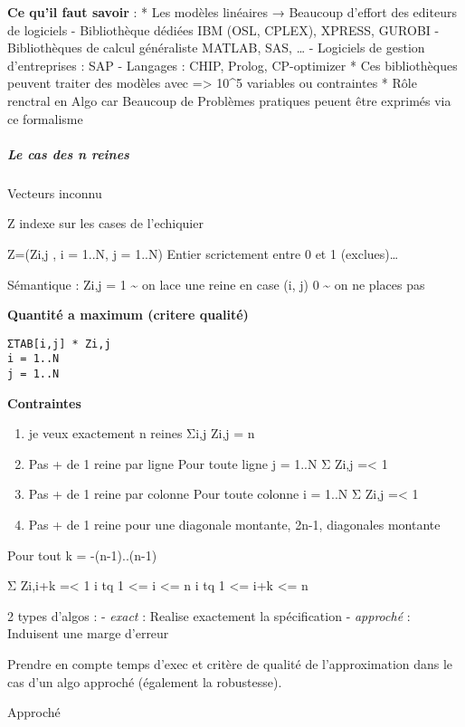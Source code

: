 \documentclass[]{article}
\begin{document}
\textbf{Ce qu'il faut savoir} : * Les modèles linéaires → Beaucoup
d'effort des editeurs de logiciels - Bibliothèque dédiées IBM (OSL,
CPLEX), XPRESS, GUROBI - Bibliothèques de calcul généraliste MATLAB,
SAS, \ldots{} - Logiciels de gestion d'entreprises : SAP - Langages :
CHIP, Prolog, CP-optimizer * Ces bibliothèques peuvent traiter des
modèles avec =\textgreater{} 10\^{}5 variables ou contraintes * Rôle
renctral en Algo car Beaucoup de Problèmes pratiques peuent être
exprimés via ce formalisme

\subparagraph{Le cas des n reines}\label{le-cas-des-n-reines}

Vecteurs inconnu

Z indexe sur les cases de l'echiquier

Z=(Zi,j , i = 1..N, j = 1..N) Entier scrictement entre 0 et 1
(exclues)\ldots{}

Sémantique : Zi,j = 1 \textasciitilde{} on lace une reine en case (i, j)
0 \textasciitilde{} on ne places pas

\textbf{Quantité a maximum (critere qualité)}

\begin{verbatim}
ΣTAB[i,j] * Zi,j
i = 1..N
j = 1..N
\end{verbatim}

\textbf{Contraintes}

\begin{enumerate}
\def\labelenumi{\arabic{enumi}.}
\item
  je veux exactement n reines Σi,j Zi,j = n
\item
  Pas + de 1 reine par ligne Pour toute ligne j = 1..N Σ Zi,j
  =\textless{} 1
\item
  Pas + de 1 reine par colonne Pour toute colonne i = 1..N Σ Zi,j
  =\textless{} 1
\item
  Pas + de 1 reine pour une diagonale montante, 2n-1, diagonales
  montante
\end{enumerate}

Pour tout k = -(n-1)..(n-1)

Σ Zi,i+k =\textless{} 1 i tq 1 \textless{}= i \textless{}= n i tq 1
\textless{}= i+k \textless{}= n

2 types d'algos : - \emph{exact} : Realise exactement la spécification -
\emph{approché} : Induisent une marge d'erreur

Prendre en compte temps d'exec et critère de qualité de l'approximation
dans le cas d'un algo approché (également la robustesse).

Approché
\end{document}
